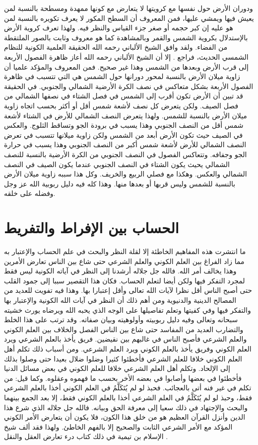 ودوران الأرض حول نفسها مع كرويتها لا يتعارض مع كونها ممهدة ومسطحة بالنسبة لمن يعيش فيها ويمشي عليها، فمن المعروف أن السطح المكور لا يعرف تكويره بالنسبة لمن هو عليه إن كبر حجمه أو صغر جزء القياس والنظر فيه. ولهذا تعرف كروية الأرض بالإستدلال بكروية الشمس والقمر وبالمشاهدة كما هو معروف وثابت بالصور الملتقطة من الفضاء. ولقد وافق الشيخ الألباني رحمه الله الحقيقة العلمية الكونية للنظام الشمسي الحديث، فراجع . إلا أن الشيخ الألباني رحمه الله أعاز ظاهرة الفصول الأربعة إلى قرب الأرض وبعدها من الشمس وهذا غير صحيح. فمن المعروف  والمؤكد علميا أن زاوية ميلان الأرض بالنسبة لمحور دورانها حول الشمس هي التي تتسبب في ظاهرة الفصول الأربعة بشكل متعاكس في نصف الكرة الأرضية الشمالي والجنوبي. في الحقيقة قد تبين أن الأرض تكون أقرب إلى الشمس في فصل الشتاء في نصفها الشمالي من فصل الصيف. ولكن يتعرض كل نصف لأشعة شمس أقل أو أكثر بحسب اتجاه زاوية ميلان الأرض بالنسبة للشمس. ولهذا يتعرض النصف الشمالي للأرض في الشتاء لأشعة شمس أقل من النصف الجنوبي وهذا يسبب في برودة الجو وتساقط الثلوج. والعكس في الصيف حيث تكون الأرض أبعد من الشمس ولكن زاوية ميلانها تتسبب في تعرض النصف الشمالي للأرض لأشعة شمس أكبر من النصف الجنوبي وهذا يسبب في حرارة الجو وجفافه. وتتعاكس الفصول في النصف الجنوبي من الكرة الأرضية بالنسبة للنصف الشمالي يحيث يكون الشتاء في النصف الجنوبي عندما يكون الصيف في النصف الشمالي والعكس. وهكذا مع فصلي الربيع والخريف. وكل هذا سببه زاوية ميلان الأرض بالنسبة للشمس وليس قربها أو بعدها منها. وهذا كله فيه دليل ربوبية الله عز وجل وفضله على خلقه. 

\section{الحساب بين الإفراط والتفريط}

ما انتشرت هذه المفاهيم الخاطئة إلا لقلة النظر والبحث في علم الحساب والإعتبار به مما زاد الفراغ بين العلم الكوني والعلم الشرعي حتى شاع بين الناس تعارض الأمرين وهذا يخالف أمر الله. فالله جل جلاله أرشدنا إلى النظر في آياته الكونية ليس فقط لمجرد التفكر فيها ولكن أيضا لتعلم الحساب. فكان هذا التقصير سببا إلى جمود القلب حتى أصبح الناس أقل نظرا لآيات الله تعالى وأقل إعتبارا بها. وهذا فيه تفويت للعديد من المصالح الدينية والدنيوية ومن أهم ذلك أن النظر في آيات الله الكونية والإعتبار بها والتفكر فيها وفي كفيتها وتعلم تفاصيلها على الوجه الذي يحبه الله ويرضاه يورث خشيته سبحانه وتعالى وفيه دليل ربوبيته وأولوهيته وبيان صفاته. وقد ترتب على هذا الخلط والتضارب العديد من المفاسد حتى شاع بين الناس الفصل والخلاف بين العلم الكوني والعلم الشرعي فأصبح الناس في غالبهم بين نقيضين. فريق يأخذ بالعلم الشرعي ويرد العلم الكوني وفريق يأخذ بالعلم الكوني ويرد العلم الشرعي. ومن أسباب ذلك تكلم أهل العلم الكوني خلافا للعلم الشرعي فأخطئوا كثيرا وضلوا ضلال بعيدا حتى وصلوا بذلك إلى الإلحاد. وتكلم أهل العلم الشرعي خلافا للعلم الكوني في بعض مسائل الدنيا فأخطئوا في بعضها وأصابوا في بعضه الأخر بحسب ما فهموه وعقلوه. وكما قيل: من تكلم في غير فنه أتى بالعجائب. فحبذ لو لم يُتَكَلَّمُ في العلم الكوني أخذا بالعلم الشرعي فقط، وحبذ لو لم يُتَكَلَّمُ في العلم الشرعي أخذا بالعلم الكوني فقط، إلا بعد الجمع بينهما والبحث والإجتهاد في ذلك سعيا إلى معرفة الحق وبيانه. فالله جل جلاله الذي شرع هذا الدين وأنزل القرآن العظيم هو من خلق هذا الكون، فلا يكون أن يتعارض الأمر الكوني المؤكد مع الأمر الشرعي الثابت والصحيح إلا بالفهم الخاطئ. ولهذا فقد ألف شيخ الإسلام بن تيمية في ذلك كتاب درء تعارض العقل والنقل \cite{ibnTaimia_DTAWN}.

